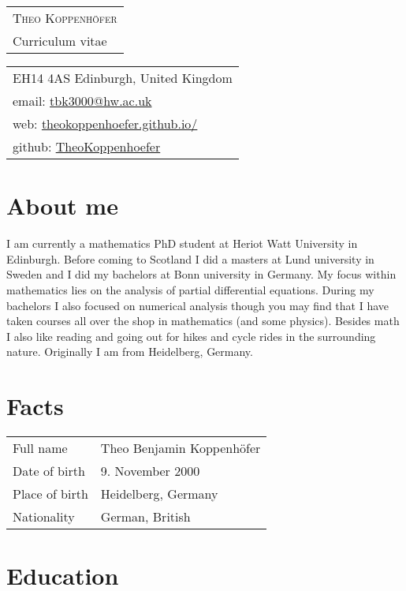 \documentclass[11pt, letterpaper]{article}
\begin{document}
\begin{minipage}[t][1.25in][t]{.5\textwidth}
\begin{tabular}{@{}l@{}} %
\\
{\Huge\scshape Theo Koppenhöfer}\\[2.35ex]
{\large Curriculum vitae}
\end{tabular}
\end{minipage}
\hfill
\begin{minipage}[t][1.25in][t]{.4\textwidth}
\hfill
\begin{tabular}{l@{}}
EH14 4AS Edinburgh, United Kingdom\\[1ex]
email: \href{mailto:tbk3000@hw.ac.uk}{tbk3000@hw.ac.uk} \\
web: \href{https://theokoppenhoefer.github.io/}{theokoppenhoefer.github.io/} \\
github: \href{https://github.com/TheoKoppenhoefer}{TheoKoppenhoefer}
\end{tabular}
\end{minipage}

\section{About me}
I am currently a mathematics PhD student at Heriot Watt University in Edinburgh.
Before coming to Scotland I did a masters at Lund university in Sweden and I did my bachelors at Bonn university in Germany. My focus within
mathematics lies on the analysis of partial differential equations.
During my bachelors I also focused on numerical analysis
though you may find that I have taken courses all over the shop in mathematics (and some physics).
Besides math I also like reading and going out for hikes and cycle rides in the surrounding nature.
Originally I am from Heidelberg, Germany.

\section{Facts}
\begin{tabularx}{\textwidth}{>{\raggedright\arraybackslash}p{45mm} X}
  Full name & Theo Benjamin Koppenhöfer \\[0.5ex]
  Date of birth & 9. November 2000 \\[0.5ex]
  Place of birth & Heidelberg, Germany \\[0.5ex]
  Nationality & German, British
\end{tabularx}\section{Education}
\end{document}
